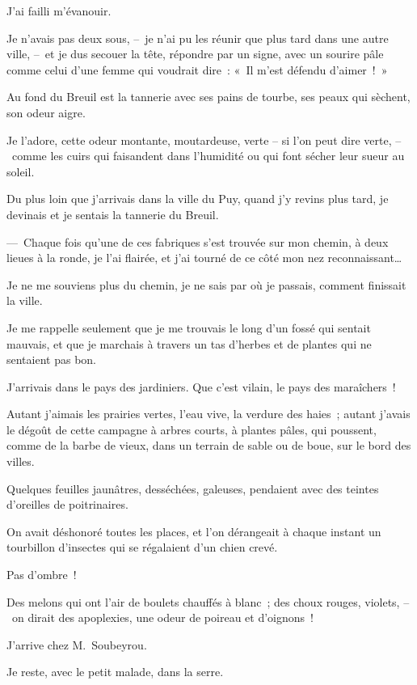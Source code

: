 \documentclass[french,twoside]{book} %
\begin{document}
\noindent J’ai failli m’évanouir.\par
Je n’avais pas deux sous, – je n’ai pu les réunir que plus tard dans une autre ville, – et je dus secouer la tête, répondre par un signe, avec un sourire pâle comme celui d’une femme qui voudrait dire : « Il m’est défendu d’aimer ! »\par
\bigbreak
\noindent Au fond du Breuil est la tannerie avec ses pains de tourbe, ses peaux qui sèchent, son odeur aigre.\par
Je l’adore, cette odeur montante, moutardeuse, verte – si l’on peut dire verte, – comme les cuirs qui faisandent dans l’humidité ou qui font sécher leur sueur au soleil.\par
Du plus loin que j’arrivais dans la ville du Puy, quand j’y revins plus tard, je devinais et je sentais la tannerie du Breuil.\par
— Chaque fois qu’une de ces fabriques s’est trouvée sur mon chemin, à deux lieues à la ronde, je l’ai flairée, et j’ai tourné de ce côté mon nez reconnaissant…\par
\bigbreak
\noindent Je ne me souviens plus du chemin, je ne sais par où je passais, comment finissait la ville.\par
Je me rappelle seulement que je me trouvais le long d’un fossé qui sentait mauvais, et que je marchais à travers un tas d’herbes et de plantes qui ne sentaient pas bon.\par
J’arrivais dans le pays des jardiniers. Que c’est vilain, le pays des maraîchers !\par
Autant j’aimais les prairies vertes, l’eau vive, la verdure des haies ; autant j’avais le dégoût de cette campagne à arbres courts, à plantes pâles, qui poussent, comme de la barbe de vieux, dans un terrain de sable ou de boue, sur le bord des villes.\par
Quelques feuilles jaunâtres, desséchées, galeuses, pendaient avec des teintes d’oreilles de poitrinaires.\par
On avait déshonoré toutes les places, et l’on dérangeait à chaque instant un tourbillon d’insectes qui se régalaient d’un chien crevé.\par
\bigbreak
\noindent Pas d’ombre !\par
Des melons qui ont l’air de boulets chauffés à blanc ; des choux rouges, violets, – on dirait des apoplexies, une odeur de poireau et d’oignons !\par
\bigbreak
\noindent J’arrive chez M. Soubeyrou.\par
Je reste, avec le petit malade, dans la serre.\par
\end{document}
